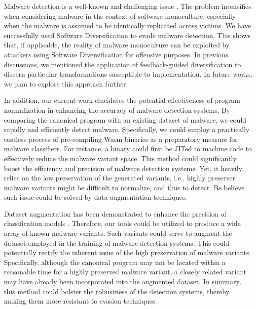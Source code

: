 \begin{strategy}

    Malware detection is a well-known and challenging issue \cite{cohen1987computer}. 
    The problem intensifies when considering malware in the context of software monoculture, especially when the malware is assumed to be identically replicated across victims. 
    We have successfully used Software Diversification to evade malware detection. 
    This shows that, if applicable, the reality of malware monoculture can be exploited by attackers using Software Diversification for offensive purposes. 
    In previous discussions, we mentioned the application of feedback-guided diversification to discern particular transformations susceptible to implementation. 
    In future works, we plan to explore this approach further.

    In addition, our current work elucidates the potential effectiveness of program normalization in enhancing the accuracy of malware detection systems. 
    By comparing the canonical program with an existing dataset of malware, we could rapidly and efficiently detect malware.
    Specifically, we could employ a practically costless process of pre-compiling Wasm binaries as a preparatory measure for malware classifiers. 
    For instance, a \wasm binary could first be JITed to machine code to effectively reduce the malware variant space. 
    This method could significantly boost the efficiency and precision of malware detection systems. 
    Yet, it heavily relies on the low preservation of the generated variants, i.e., highly preserver malware variants might be difficult to normalize, and thus to detect.
    Be believe such issue could be solved by data augmentation techniques.

    Dataset augmentation has been demonstrated to enhance the precision of classification models \cite{2021arXiv210311882S, selfAPR, 10.1109/TSE.2023.3240118}.
    Therefore, our tools could be utilized to produce a wide array of known malware variants.
    Such variants could serve to augment the dataset employed in the training of malware detection systems.
    This could potentially rectify the inherent issue of the high preservation of malware variants.
    Specifically, although the canonical program may not be located within a reasonable time for a highly preserved malware variant, a closely related variant may have already been incorporated into the augmented dataset.
    In summary, this method could bolster the robustness of the detection systems, thereby making them more resistant to evasion techniques.



\end{strategy}


